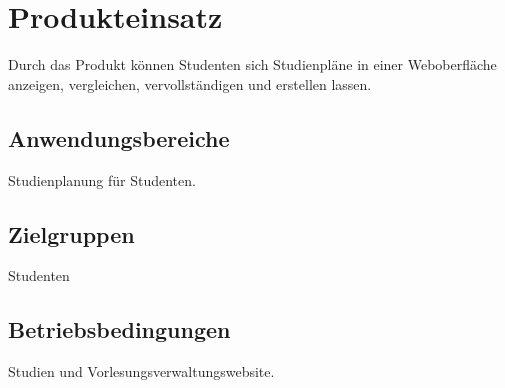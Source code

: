 \section{Produkteinsatz}
Durch das Produkt können Studenten sich Studienpläne in einer Weboberfläche anzeigen, vergleichen, vervollständigen und erstellen lassen.  

\subsection{Anwendungsbereiche}
Studienplanung für Studenten.

\subsection{Zielgruppen}
Studenten
\subsection{Betriebsbedingungen}
Studien und Vorlesungsverwaltungswebsite.